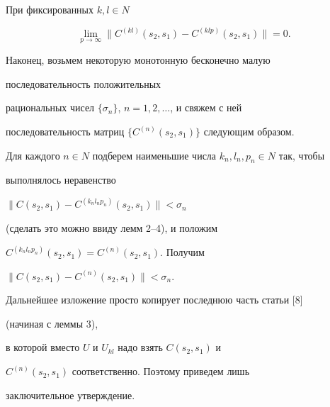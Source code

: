 \begin{lem}


При фиксированных $k,l\in N$


$$


\lim_{p\to\infty}\|C^{(kl)}(s_2,s_1)-C^{(klp)}(s_2,s_1)\|=0.


$$


\end{lem}





Наконец, возьмем некоторую монотонную бесконечно малую 


последовательность положительных


рациональных чисел $\{\sigma_n\}$, $n=1,2,\dotsc$, и свяжем с ней


последовательность матриц $\{C^{(n)}(s_2,s_1)\}$ следующим образом.





Для каждого $n\in N$ подберем наименьшие числа $k_n,l_n,p_n\in N$ так, чтобы


выполнялось неравенство


$\|C(s_2,s_1)-C^{(k_nl_np_n)}(s_2,s_1)\|<\sigma_n$


(сделать это можно ввиду лемм 2--4), и положим


$C^{(k_nl_np_n)}(s_2,s_1)=C^{(n)}(s_2,s_1)$. Получим


$\|C(s_2,s_1)-C^{(n)}(s_2,s_1)\|<\sigma_n$.





Дальнейшее изложение просто копирует последнюю часть статьи [8]


(начиная с леммы 3),


в которой вместо $U$ и $U_{kl}$  надо взять  $C(s_2,s_1)$ и


$C^{(n)}(s_2,s_1)$ соответственно. Поэтому приведем лишь 


заключительное утверждение.





